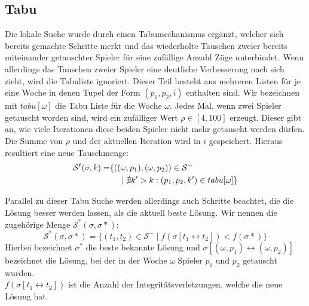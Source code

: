 \subsection{Tabu}
Die lokale Suche wurde durch einen Tabumechanismus ergänzt, welcher sich bereits gemachte Schritte merkt und das wiederholte Tauschen zweier bereits miteinander getauschter Spieler für eine zufällige Anzahl Züge unterbindet.
Wenn allerdings das Tauschen zweier Spieler eine deutliche Verbesserung nach sich zieht, wird die Tabuliste ignoriert.
Dieser Teil besteht aus mehreren Listen für je eine Woche in denen Tupel der Form $(p_1, p_2, i)$ enthalten sind. Wir bezeichnen mit $tabu[\omega]$ die Tabu Liste für die Woche $\omega$. 
Jedes Mal, wenn zwei Spieler getauscht worden sind, wird ein zufälliger Wert $\rho \in [4, 100]$ erzeugt. Dieser gibt an, wie viele Iterationen diese beiden Spieler nicht mehr getauscht werden dürfen. 
Die Summe von $\rho$ und der aktuellen Iteration wird in $i$ gespeichert. Hieraus resultiert eine neue Tauschmenge:
\begin{equation}
\begin{split} 
  \mathcal{S}^t(\sigma, k) = & \{ ((\omega, p_1), (\omega, p_2)) \in \mathcal{S}^- \\
    & \hspace{5 mm} | \; \nexists k' > k: (p_1, p_2, k') \in tabu[\omega] \}
\end{split} 
\end{equation}

Parallel zu dieser Tabu Suche werden allerdings auch Schritte beachtet, die die Lösung besser werden lassen, als die aktuell beste Lösung. Wir nennen die zugehörige Menge $\mathcal{S}^*(\sigma, \sigma*)$:
\begin{equation}
  \mathcal{S}^*(\sigma, \sigma*) = \{ (t_1, t_2) \in \mathcal{S}^- \;|\; f(\sigma [t_1 \leftrightarrow t_2] ) < f(\sigma *) \}
\end{equation}
Hierbei bezeichnet $\sigma^*$ die beste bekannte Lösung und $\sigma [(\omega, p_1) \leftrightarrow (\omega, p_2)]$ bezeichnet die Lösung, bei der in der  Woche $\omega$ Spieler $p_1$ und $p_2$ getauscht wurden.\\
$f(\sigma [t_1 \leftrightarrow t_2])$ ist die Anzahl der Integritätsverletzungen, welche die neue Lösung hat.


